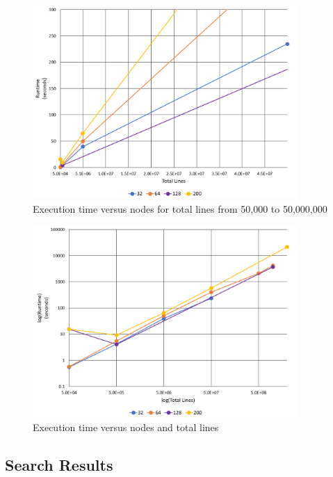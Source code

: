 \begin{figure}
\includegraphics[width=0.9\textwidth]{./images/Runtime1.png}
\caption{Execution time versus nodes for total lines from 50,000 to 50,000,000}
\end{figure}


\begin{figure}
\includegraphics[width=0.9\textwidth]{./images/Runtime2.png}
\caption{Execution time versus nodes and total lines}
\end{figure}


%
%

\subsection{Search Results}

